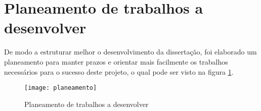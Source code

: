 \section{Planeamento de trabalhos a desenvolver} %
\label{sec:planeamento_de_trabalhos_a_desenvolver}

De modo a estruturar melhor o desenvolvimento da dissertação, foi elaborado um planeamento para manter prazos e orientar mais facilmente os trabalhos necessários para o sucesso deste projeto, o qual pode ser visto na figura \ref{fig:planeamento_de_trabalhos_a_desenvolver}.

\begin{figure}[hbtp]
	\centering
	\texttt{[image: planeamento]}
	\caption{Planeamento de trabalhos a desenvolver}
	\label{fig:planeamento_de_trabalhos_a_desenvolver}
\end{figure}